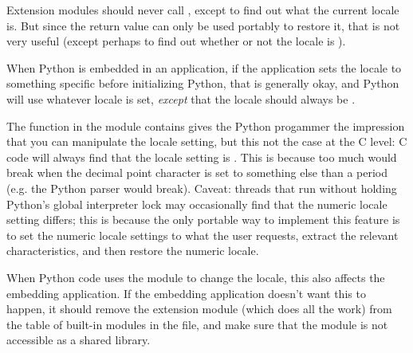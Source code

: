 Extension modules should never call , except to
find out what the current locale is.  But since the return value can
only be used portably to restore it, that is not very useful (except
perhaps to find out whether or not the locale is ).

When Python is embedded in an application, if the application sets the
locale to something specific before initializing Python, that is
generally okay, and Python will use whatever locale is set,
\emph{except} that the  locale should always be
.

The  function in the  module contains
gives the Python progammer the impression that you can manipulate the
 locale setting, but this not the case at the C
level: C code will always find that the  locale
setting is .  This is because too much would break when the
decimal point character is set to something else than a period
(e.g. the Python parser would break).  Caveat: threads that run
without holding Python's global interpreter lock may occasionally find
that the numeric locale setting differs; this is because the only
portable way to implement this feature is to set the numeric locale
settings to what the user requests, extract the relevant
characteristics, and then restore the  numeric locale.

When Python code uses the  module to change the locale,
this also affects the embedding application.  If the embedding
application doesn't want this to happen, it should remove the
 extension module (which does all the work) from the
table of built-in modules in the  file, and make sure
that the  module is not accessible as a shared library.
